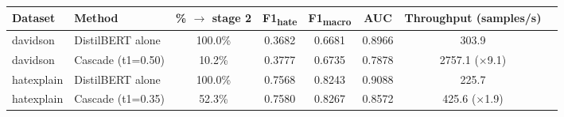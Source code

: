 \begin{tabular}{llcccccc}
\toprule
Dataset & Method & \% $\to$ stage 2 & F1\textsubscript{hate} & F1\textsubscript{macro} & AUC & Throughput (samples/s) \\
\midrule
davidson & DistilBERT alone & 100.0\% & 0.3682 & 0.6681 & 0.8966 & 303.9 \\
davidson & Cascade (t1=0.50) & 10.2\% & 0.3777 & 0.6735 & 0.7878 & 2757.1 ($\times$9.1) \\
hatexplain & DistilBERT alone & 100.0\% & 0.7568 & 0.8243 & 0.9088 & 225.7 \\
hatexplain & Cascade (t1=0.35) & 52.3\% & 0.7580 & 0.8267 & 0.8572 & 425.6 ($\times$1.9) \\
\bottomrule
\end{tabular}
